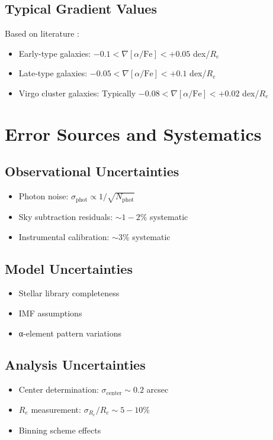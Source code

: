 \documentclass[11pt,a4paper]{article}
\begin{document}
\subsection{Typical Gradient Values}

Based on literature \citep{Liu2016, Li2019}:
\begin{itemize}
\item Early-type galaxies: $-0.1 < \nabla[\alpha/\text{Fe}] < +0.05$ dex/$R_e$
\item Late-type galaxies: $-0.05 < \nabla[\alpha/\text{Fe}] < +0.1$ dex/$R_e$
\item Virgo cluster galaxies: Typically $-0.08 < \nabla[\alpha/\text{Fe}] < +0.02$ dex/$R_e$
\end{itemize}

\section{Error Sources and Systematics}

\subsection{Observational Uncertainties}
\begin{itemize}
\item Photon noise: $\sigma_{\text{phot}} \propto 1/\sqrt{N_{\text{phot}}}$
\item Sky subtraction residuals: $\sim 1-2\%$ systematic
\item Instrumental calibration: $\sim 3\%$ systematic
\end{itemize}

\subsection{Model Uncertainties}
\begin{itemize}
\item Stellar library completeness
\item IMF assumptions
\item α-element pattern variations
\end{itemize}

\subsection{Analysis Uncertainties}
\begin{itemize}
\item Center determination: $\sigma_{\text{center}} \sim 0.2$ arcsec
\item $R_e$ measurement: $\sigma_{R_e}/R_e \sim 5-10\%$
\item Binning scheme effects
\end{itemize}
\end{document}
